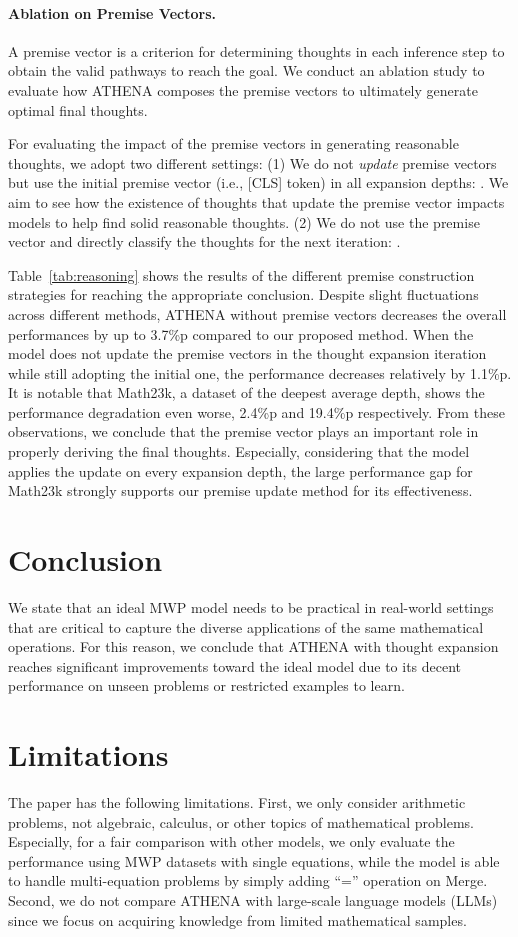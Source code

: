 \documentclass[11pt]{article}
\newcommand{\1}{\mathbb{1}}
\begin{document}
\paragraph{Ablation on Premise Vectors.}
A premise vector is a criterion for determining thoughts in each inference step to obtain the valid pathways to reach the goal.
We conduct an ablation study to evaluate how ATHENA composes the premise vectors to ultimately generate optimal final thoughts.  

For evaluating the impact of the premise vectors in generating reasonable thoughts, we adopt two different settings:
(1) We do not \textit{update} premise vectors but use the initial premise vector (i.e., [CLS] token) in all expansion depths: .
We aim to see how the existence of thoughts that update the premise vector impacts models to help find solid reasonable thoughts.
(2) We do not use the premise vector and directly classify the thoughts for the next iteration:  .


Table~\ref{tab:reasoning} shows the results of the different premise construction strategies for reaching the appropriate conclusion.
Despite slight fluctuations across different methods, ATHENA without premise vectors decreases the overall performances by up to 3.7\%p compared to our proposed method.
When the model does not update the premise vectors in the thought expansion iteration while still adopting the initial one, the performance decreases relatively by 1.1\%p.
It is notable that Math23k, a dataset of the deepest average depth, shows the performance degradation even worse, 2.4\%p and 19.4\%p respectively.
From these observations, we conclude that the premise vector plays an important role in properly deriving the final thoughts.
Especially, considering that the model applies the update on every expansion depth, the large performance gap for Math23k strongly supports our premise update method for its effectiveness.


\section{Conclusion}
We state that an ideal MWP model needs to be practical in real-world settings that are critical to capture the diverse applications of the same mathematical operations.
For this reason, we conclude that ATHENA with thought expansion reaches significant improvements toward the ideal model due to its decent performance on unseen problems or restricted examples to learn.

\section*{Limitations}
The paper has the following limitations.
First, we only consider arithmetic problems, not algebraic, calculus, or other topics of mathematical problems.
Especially, for a fair comparison with other 
models, we only evaluate the performance using MWP datasets with single equations, while the model is able to handle multi-equation problems by simply adding ``='' operation on Merge.
Second, we do not compare ATHENA with large-scale language models (LLMs) since 
we focus on acquiring knowledge from limited mathematical samples.
\end{document}
